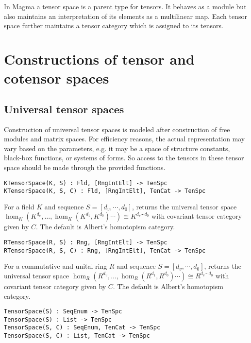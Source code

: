 
In Magma a tensor space is a parent type for tensors.  It behaves
as a module but also maintains an interpretation of its elements as
a multilinear map.  Each tensor space further maintains a tensor category
which is assigned to its tensors.


\section{Constructions of tensor and cotensor spaces}

\subsection{Universal tensor spaces}

Construction of universal tensor spaces is modeled after construction of free 
modules and matrix spaces. For efficiency reasons, the actual representation 
may 
vary based on the parameters, e.g. it may be a space of structure constants, 
black-box functions, or systems of forms. So access to the tensors in these 
tensor space should be made through the provided functions.

\color{blue}
{\small \begin{verbatim}
KTensorSpace(K, S) : Fld, [RngIntElt] -> TenSpc
KTensorSpace(K, S, C) : Fld, [RngIntElt], TenCat -> TenSpc
\end{verbatim} }
\color{black}

For a field $K$ and sequence $S=[d_v,\cdots, d_0]$, 
returns the universal tensor space $\hom_K(K^{d_v},\dots ,\hom_K(K^{d_1},K^{d_0})\cdots )\cong K^{d_v\cdots d_0}$
with covariant tensor category given by $C$.
The default is Albert's homotopism category.

\color{blue}
{\small \begin{verbatim}
RTensorSpace(R, S) : Rng, [RngIntElt] -> TenSpc
RTensorSpace(R, S, C) : Rng, [RngIntElt], TenCat -> TenSpc
\end{verbatim} }
\color{black}

For a commutative and unital ring $R$ and sequence $S=[d_v,\cdots, d_0]$, 
returns the universal tensor space $\hom_R(R^{d_v},\dots ,\hom_R(R^{d_1},R^{d_0})\cdots )\cong R^{d_v\cdots d_0}$
with covariant tensor category given by $C$.
The default is Albert's homotopism category.

\color{blue}
{\small \begin{verbatim}
TensorSpace(S) : SeqEnum -> TenSpc
TensorSpace(S) : List -> TenSpc
TensorSpace(S, C) : SeqEnum, TenCat -> TenSpc
TensorSpace(S, C) : List, TenCat -> TenSpc
\end{verbatim} }
\color{black}

